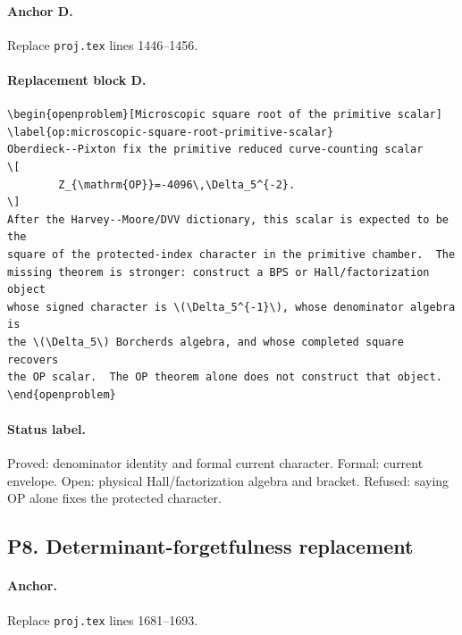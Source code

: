 \paragraph{Anchor D.}
Replace \texttt{proj.tex} lines 1446--1456.

\paragraph{Replacement block D.}
\begin{verbatim}
\begin{openproblem}[Microscopic square root of the primitive scalar]
\label{op:microscopic-square-root-primitive-scalar}
Oberdieck--Pixton fix the primitive reduced curve-counting scalar
\[
        Z_{\mathrm{OP}}=-4096\,\Delta_5^{-2}.
\]
After the Harvey--Moore/DVV dictionary, this scalar is expected to be the
square of the protected-index character in the primitive chamber.  The
missing theorem is stronger: construct a BPS or Hall/factorization object
whose signed character is \(\Delta_5^{-1}\), whose denominator algebra is
the \(\Delta_5\) Borcherds algebra, and whose completed square recovers
the OP scalar.  The OP theorem alone does not construct that object.
\end{openproblem}
\end{verbatim}

\paragraph{Status label.}
Proved: denominator identity and formal current character.  Formal:
current envelope.  Open: physical Hall/factorization algebra and bracket.
Refused: saying OP alone fixes the protected character.

\subsection{P8. Determinant-forgetfulness replacement}

\paragraph{Anchor.}
Replace \texttt{proj.tex} lines 1681--1693.

